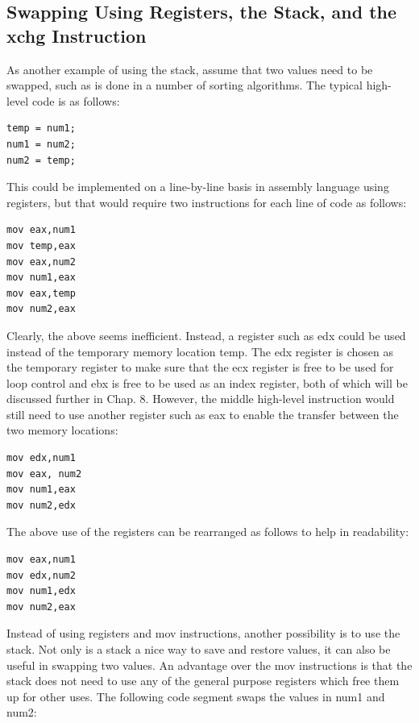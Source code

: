 \documentclass[10pt]{book}
\begin{document}
\subsection{Swapping Using Registers, the Stack, and the xchg Instruction}
As another example of using the stack, assume that two values need to be swapped, such as is done in a number of sorting algorithms. The typical high-level code is as follows:

\begin{verbatim}
temp = num1;
num1 = num2;
num2 = temp;
\end{verbatim}

This could be implemented on a line-by-line basis in assembly language using registers, but that would require two instructions for each line of code as follows:

\begin{verbatim}
mov eax,num1
mov temp,eax
mov eax,num2
mov num1,eax
mov eax,temp
mov num2,eax
\end{verbatim}

Clearly, the above seems inefficient. Instead, a register such as edx could be used instead of the temporary memory location temp. The edx register is chosen as the temporary register to make sure that the ecx register is free to be used for loop control and ebx is free to be used as an index register, both of which will be discussed further in Chap. 8. However, the middle high-level instruction would still need to use another register such as eax to enable the transfer between the two memory locations:
\begin{verbatim}
mov edx,num1
mov eax, num2
mov num1,eax
mov num2,edx
\end{verbatim}

The above use of the registers can be rearranged as follows to help in readability:

\begin{verbatim}
mov eax,num1
mov edx,num2
mov num1,edx
mov num2,eax
\end{verbatim}

Instead of using registers and mov instructions, another possibility is to use the stack. Not only is a stack a nice way to save and restore values, it can also be useful in swapping two values. An advantage over the mov instructions is that the stack does not need to use any of the general purpose registers which free them up for other uses. The following code segment swaps the values in num1 and num2:
\end{document}
